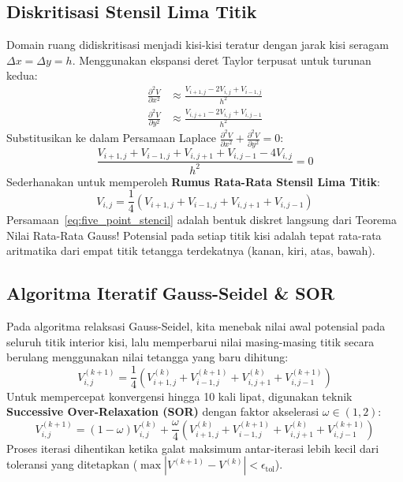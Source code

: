 \documentclass[11pt,a4paper]{article}
\theoremstyle{definition}
\begin{document}
\subsection{Diskritisasi Stensil Lima Titik}
Domain ruang didiskritisasi menjadi kisi-kisi teratur dengan jarak kisi seragam $\Delta x = \Delta y = h$. Menggunakan ekspansi deret Taylor terpusat untuk turunan kedua:
\begin{align}
    \frac{\partial^2 V}{\partial x^2} &\approx \frac{V_{i+1, j} - 2 V_{i,j} + V_{i-1, j}}{h^2} \\
    \frac{\partial^2 V}{\partial y^2} &\approx \frac{V_{i, j+1} - 2 V_{i,j} + V_{i, j-1}}{h^2}
\end{align}
Substitusikan ke dalam Persamaan Laplace $\frac{\partial^2 V}{\partial x^2} + \frac{\partial^2 V}{\partial y^2} = 0$:
\begin{equation*}
    \frac{V_{i+1, j} + V_{i-1, j} + V_{i, j+1} + V_{i, j-1} - 4 V_{i,j}}{h^2} = 0
\end{equation*}
Sederhanakan untuk memperoleh \textbf{Rumus Rata-Rata Stensil Lima Titik}:
\begin{equation}
    V_{i,j} = \frac{1}{4} \left( V_{i+1, j} + V_{i-1, j} + V_{i, j+1} + V_{i, j-1} \right)
    \label{eq:five_point_stencil}
\end{equation}
Persamaan~\eqref{eq:five_point_stencil} adalah bentuk diskret langsung dari Teorema Nilai Rata-Rata Gauss! Potensial pada setiap titik kisi adalah tepat rata-rata aritmatika dari empat titik tetangga terdekatnya (kanan, kiri, atas, bawah).

\subsection{Algoritma Iteratif Gauss-Seidel \& SOR}
Pada algoritma relaksasi Gauss-Seidel, kita menebak nilai awal potensial pada seluruh titik interior kisi, lalu memperbarui nilai masing-masing titik secara berulang menggunakan nilai tetangga yang baru dihitung:
\begin{equation}
    V_{i,j}^{(k+1)} = \frac{1}{4} \left( V_{i+1, j}^{(k)} + V_{i-1, j}^{(k+1)} + V_{i, j+1}^{(k)} + V_{i, j-1}^{(k+1)} \right)
\end{equation}
Untuk mempercepat konvergensi hingga 10 kali lipat, digunakan teknik \textbf{Successive Over-Relaxation (SOR)} dengan faktor akselerasi $\omega \in (1, 2)$:
\begin{equation}
    V_{i,j}^{(k+1)} = (1 - \omega) V_{i,j}^{(k)} + \frac{\omega}{4} \left( V_{i+1, j}^{(k)} + V_{i-1, j}^{(k+1)} + V_{i, j+1}^{(k)} + V_{i, j-1}^{(k+1)} \right)
\end{equation}
Proses iterasi dihentikan ketika galat maksimum antar-iterasi lebih kecil dari toleransi yang ditetapkan ($\max |V^{(k+1)} - V^{(k)}| < \epsilon_{\text{tol}}$).
\end{document}
